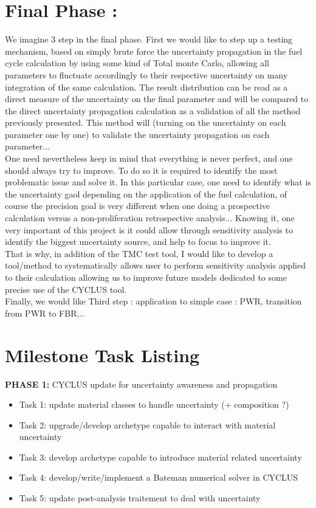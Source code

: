 \documentclass[dvips,12pt]{article}
\begin{document}
\section{Final Phase :}
We imagine 3 step in the final phase. First we would like to step up a testing mechanism, based on simply brute force the uncertainty propagation in the fuel cycle calculation by using some kind of Total monte Carlo, allowing all parameters to fluctuate accordingly to their respective uncertainty on many integration of the same calculation. The result distribution can be read as a direct measure of the uncertainty on the final parameter and will be compared to the direct uncertainty propagation calculation as a validation of all the method previously presented. This method will (turning on the uncertainty on each parameter one by one) to validate the uncertainty propagation on each parameter...\\
One need nevertheless keep in mind that everything is never perfect, and one should always try to improve. To do so it is required to identify the most problematic issue and solve it. In this particular case, one need to identify what is the uncertainty gaol depending on the application of the fuel calculation, of course the precision goal is very different when one doing a prospective calculation versus a non-proliferation retrospective analysis... Knowing it, one very important of this project is it could allow through sensitivity analysis to identify the biggest uncertainty source, and help to focus to improve it.\\
That is why, in addition of the TMC test tool, I would like to develop a tool/method to systematically allows user to perform sensitivity analysis applied to their calculation allowing us to improve future models dedicated to some precise use of the CYCLUS tool.\\


Finally, we would like
Third step : application to simple case : PWR, transition from PWR to FBR...

\pagebreak
\section{Milestone Task Listing}

\textbf{PHASE 1:} CYCLUS update for uncertainty awareness and propagation

\begin{itemize}
\item Task 1: update material classes to handle uncertainty (+ composition ?)
\item Task 2: upgrade/develop archetype capable to interact with material uncertainty
\item Task 3: develop archetype capable to introduce material related uncertainty
\item Task 4: develop/write/implement a Bateman numerical solver in CYCLUS
\item Task 5: update post-analysis traitement to deal with uncertainty  
\end{itemize}
 
\end{document}
